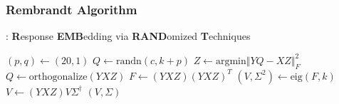 \documentclass{beamer}
\begin{document}
\begin{frame}
\frametitle{Rembrandt Algorithm}
\begin{algorithm}[H]
\caption{: \textbf{R}esponse \textbf{EMB}edding via \textbf{RAND}omized \textbf{T}echniques}
    \State $(p, q) \gets (20, 1)$ 
    \State $Q \gets \text{randn}(c, k + p)$
        \State $Z \gets \text{argmin} \Vert YQ - XZ \Vert_F^2$
        \State $Q \gets \text{orthogonalize}(YXZ)$
    \EndFor
    \State $F \gets (YXZ)(YXZ)^T$
    \State $(V, \Sigma^2) \gets \text{eig}(F, k)$
    \State $V \gets (YXZ)V\Sigma^\dagger$
    \State \Return $(V, \Sigma)$
\EndFunction
\end{algorithm}
\end{frame}





\end{document}
